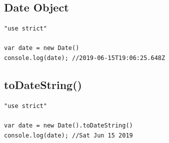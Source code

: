\documentclass[10pt, a4paper, twocolumn]{article}
\begin{document}
\subsection{Date Object}

\begin{lstlisting}
"use strict"

var date = new Date()
console.log(date); //2019-06-15T19:06:25.648Z

\end{lstlisting}

\subsection{toDateString()}

\begin{lstlisting}
"use strict"

var date = new Date().toDateString()
console.log(date); //Sat Jun 15 2019
\end{lstlisting}

\printbibliography[title={Bibliography}] %

\end{document}
